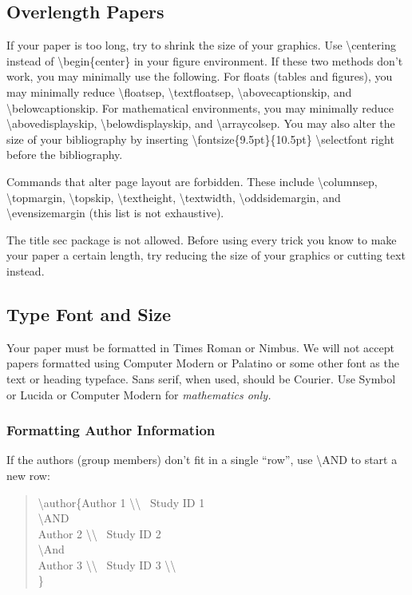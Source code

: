 \documentclass[letterpaper]{article}
\begin{document}
\subsection{Overlength Papers}
If your paper is too long, try to shrink the size of your graphics. Use \textbackslash centering instead of \textbackslash begin\{center\} in your figure environment. If these two methods don't work, you may minimally use the following. For floats (tables and figures), you may minimally reduce \textbackslash floatsep, \textbackslash textfloatsep, \textbackslash abovecaptionskip, and \textbackslash belowcaptionskip. For mathematical environments, you may minimally reduce \textbackslash abovedisplayskip, \textbackslash belowdisplayskip, and \textbackslash arraycolsep. You may also alter the size of your bibliography by inserting \textbackslash fontsize\{9.5pt\}\{10.5pt\} \textbackslash selectfont
right before the bibliography. 

Commands that alter page layout are forbidden. These include \textbackslash columnsep, \textbackslash topmargin, \textbackslash topskip, \textbackslash textheight, \textbackslash textwidth, \textbackslash oddsidemargin, and \textbackslash evensizemargin (this list is not exhaustive). 

The title sec package is not allowed. Before using every trick you know to make your paper a certain length, try reducing the size of your graphics or cutting text instead.

\subsection{Type Font and Size}
Your paper must be formatted in Times Roman or Nimbus. We will not accept papers formatted using Computer Modern or Palatino or some other font as the text or heading typeface. Sans serif, when used, should be Courier. Use Symbol or Lucida or Computer Modern for \textit{mathematics only. } 

\subsubsection{Formatting Author Information}
If the authors (group members) don't fit in a single ``row'', use \textbackslash AND to start a new row:
\begin{quote}
\begin{small}
\textbackslash author\{Author 1 \textbackslash\textbackslash ~ Study ID 1  \\
\textbackslash AND\\
Author 2 \textbackslash\textbackslash ~ Study ID 2  \\
\textbackslash And\\
Author 3 \textbackslash\textbackslash ~ Study ID 3 \textbackslash\textbackslash ~ \\\}
\end{small}
\end{quote}
\end{document}
